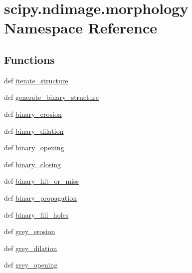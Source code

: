 \hypertarget{namespacescipy_1_1ndimage_1_1morphology}{}\section{scipy.\+ndimage.\+morphology Namespace Reference}
\label{namespacescipy_1_1ndimage_1_1morphology}
\subsection*{Functions}
\begin{DoxyCompactItemize}
\item 
def \hyperlink{namespacescipy_1_1ndimage_1_1morphology_a243de7395c0bb4289df930f188c83dac}{iterate\+\_\+structure}
\item 
def \hyperlink{namespacescipy_1_1ndimage_1_1morphology_a922ee701102af4c8ec474616de017af3}{generate\+\_\+binary\+\_\+structure}
\item 
def \hyperlink{namespacescipy_1_1ndimage_1_1morphology_ae73c8293c1bd5bfea8af1bf3af3628a7}{binary\+\_\+erosion}
\item 
def \hyperlink{namespacescipy_1_1ndimage_1_1morphology_a4833d1652c340012546d6ffee4f1a19c}{binary\+\_\+dilation}
\item 
def \hyperlink{namespacescipy_1_1ndimage_1_1morphology_ab260e60f50d14fcc0398ed5c942acea7}{binary\+\_\+opening}
\item 
def \hyperlink{namespacescipy_1_1ndimage_1_1morphology_a1c44029fb38a136a4857e1bd8b2e9e4b}{binary\+\_\+closing}
\item 
def \hyperlink{namespacescipy_1_1ndimage_1_1morphology_a74d48edbebc30cabfbbe38d0b1aed23f}{binary\+\_\+hit\+\_\+or\+\_\+miss}
\item 
def \hyperlink{namespacescipy_1_1ndimage_1_1morphology_a1da493a296e56ae34ad6c24e19596694}{binary\+\_\+propagation}
\item 
def \hyperlink{namespacescipy_1_1ndimage_1_1morphology_a2524bac6b2cef8e396c6df2207003e46}{binary\+\_\+fill\+\_\+holes}
\item 
def \hyperlink{namespacescipy_1_1ndimage_1_1morphology_aa5a7684ebf91074d01d01a21c8c1e3fe}{grey\+\_\+erosion}
\item 
def \hyperlink{namespacescipy_1_1ndimage_1_1morphology_a2797039bf4c5ecf1c5325486d2d2a9a3}{grey\+\_\+dilation}
\item 
def \hyperlink{namespacescipy_1_1ndimage_1_1morphology_ad2c94356038bb7c8160c0ebbe9961865}{grey\+\_\+opening}
\item 

\end{DoxyCompactItemize}

